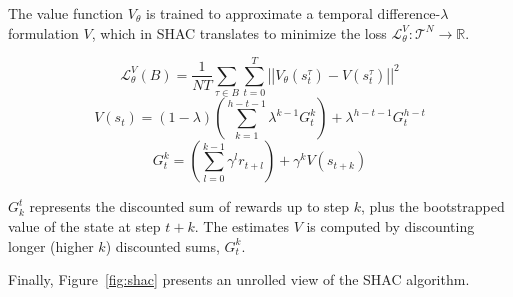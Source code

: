 The value function $V_\theta$ is trained to approximate a temporal difference-$\lambda$ formulation \cite{Sutton98} $V$, which in SHAC translates to minimize the loss $\mathcal{L}_\theta^{V}:\mathcal{T}^N\rightarrow\mathbb{R}$.

$$ \mathcal{L}_\theta^V(B)=\frac{1}{NT}\sum_{\tau\in B}\sum_{t=0}^T\left|\left| V_\theta(s^\tau_t) - V(s^\tau_t) \right|\right|^2 $$
$$ V(s_t) = (1-\lambda) \left(\sum_{k=1}^{h-t-1}\lambda^{k-1}G_t^k\right) + \lambda^{h-t-1}G_t^{h-t}$$
$$ G_t^k = \left(\sum_{l=0}^{k-1}\gamma^l r_{t+l}\right) + \gamma^k V(s_{t+k})$$

$G^t_k$ represents the discounted sum of rewards up to step $k$, plus the bootstrapped value of the state at step $t+k$. The estimates $V$ is computed by discounting longer (higher $k$) discounted sums, $G^k_t$.

Finally, Figure~\ref{fig:shac} presents an unrolled view of the SHAC algorithm.
